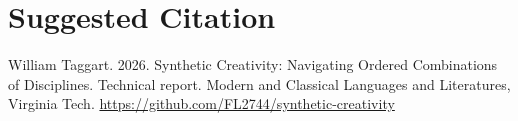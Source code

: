 \documentclass[manuscript,screen,nonacm]{acmart}
\begin{document}


\section*{Suggested Citation}
William Taggart. 2026. Synthetic Creativity: Navigating Ordered Combinations of Disciplines. Technical report. Modern and Classical Languages and Literatures, Virginia Tech.
\url{https://github.com/FL2744/synthetic-creativity}
\end{document}
